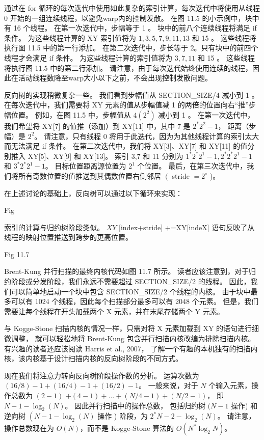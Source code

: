 通过在 for 循环的每次迭代中使用如此复杂的索引计算，每次迭代中将使用从线程 0 开始的一组连续线程，以避免warp内的控制发散。 
在图 11.5 的小示例中，块中有 16 个线程。 在第一次迭代中，步幅等于 1 。 块中的前八个连续线程将满足 if 条件。 
为这些线程计算的 XY 索引值将为 $1,3,5,7,9,11,13$ 和 15 。 这些线程将执行图 11.5 中的第一行添加。 
在第二次迭代中，步长等于 2。只有块中的前四个线程才会满足 if 条件。 为这些线程计算的索引值将为 $3,7,11$ 和 15 。 
这些线程将执行图 11.5 中的第二行添加。 
请注意，由于每次迭代始终使用连续的线程，因此在活动线程数降至warp大小以下之前，不会出现控制发散问题。

反向树的实现稍微复杂一些。 我们看到步幅值从 SECTION\_SIZE/4 减小到 1 。 
在每次迭代中，我们需要将 XY 元素的值从步幅值减 1 的两倍的位置向右“推”步幅位置。 
例如，在图 11.5 中，步幅值从 $4\left(2^{2}\right)$ 减小到 1 。 
在第一次迭代中，我们希望将 XY[7] 的值推（添加）到 XY[11] 中，其中 7 是 $2^{*} 2^{2}-1$，
距离（步幅）是 $2^{ 2}$。 请注意，只有线程 0 将用于此迭代，因为为其他线程计算的索引太大而无法满足 if 条件。 
在第二次迭代中，我们将 XY[3]、XY[7] 和 XY[11] 的值分别推入 XY[5]、XY[9] 和 XY[13]。 
索引 3,7 和 11 分别为 $1^{*} 2^{*} 2^{1}-1,2^{*} 2^{*} 2^{1}-1$ 和 $3^{*} 2^{*} 2^{1}-1$。 
目标位置距离源位置为 $2^{1}$ 个位置。 
最后，在第三次迭代中，我们将所有奇数位置的值推送到其偶数位置右侧邻居 $\left(\right.$ stride $=2^{\circ}$ )。

在上述讨论的基础上，反向树可以通过以下循环来实现：

{\color{red} Fig}

索引的计算与归约树阶段类似。 $X Y$ [index+stride] +=XY[indeX] 语句反映了从线程的映射位置推送到跨步的更高位置。

{\color{red} Fig 11.7}

Brent-Kung 并行扫描的最终内核代码如图 11.7 所示。 
读者应该注意到，对于归约阶段或分发阶段，我们永远不需要超过 SECTION\_SIZE/2 的线程。 
因此，我们可以简单地启动一个块中包含 SECTION\_SIZE/2 个线程的内核。 
由于块中最多可以有 1024 个线程，因此每个扫描部分最多可以有 2048 个元素。 
但是，我们需要让每个线程在开头加载两个 X 元素，并在末尾存储两个 Y 元素。

与 Kogge-Stone 扫描内核的情况一样，只需对将 X 元素加载到 XY 的语句进行细微调整，
就可以轻松地将 Brent-Kung 包含并行扫描内核改编为排除扫描内核。 有兴趣的读者还应该阅读 Harris et al., 2007，
了解一个有趣的本机独有的扫描内核，该内核基于设计扫描内核的反向树阶段的不同方式。

现在我们将注意力转向反向树阶段操作数的分析。 运算次数为$(16 / 8)-1+(16 / 4)-1+(16 / 2)-1$。 
一般来说，对于 $N$ 个输入元素，操作总数为 $(2-1)$ $+(4-1)+\ldots+(N / 4-1)+(N / 2-1)$， 
即 $N-1-\log _{2}(N)$。 因此并行扫描中的操作总数，
包括归约树 $(N-1$ 操作) 和逆向树 $\left(N-1-\log _{2}(N)\right.$ 操作 ) 阶段，为 $2^{*} N-2-\log _{2}(N)$。 
请注意，操作总数现在为 $O(N)$，而不是 Kogge-Stone 算法的 $O\left(N^{*} \log _{2} N\right)$。

